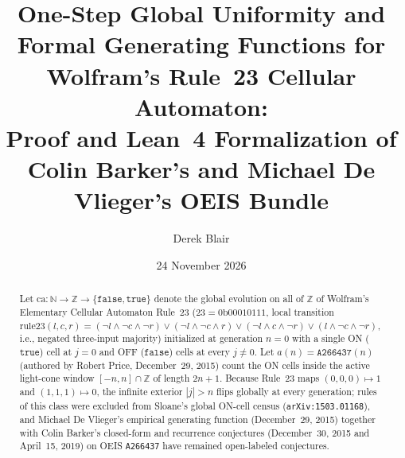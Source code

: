 \documentclass[11pt]{article}
\title{One-Step Global Uniformity and Formal Generating Functions for Wolfram's Rule~23 Cellular Automaton:\\[2pt]
\large Proof and Lean~4 Formalization of Colin Barker's and Michael De Vlieger's OEIS \seq{A266437} Bundle}
\author{Derek Blair}
\date{24 November 2026}
\theoremstyle{definition}
\newcommand{\N}{\mathbb{N}}
\newcommand{\Z}{\mathbb{Z}}
\newcommand{\seq}[1]{\texttt{#1}}
\newcommand{\ca}{\mathrm{ca}}
\newcommand{\ruleTwoThree}{\mathrm{rule23}}
\newcommand{\btrue}{\mathtt{true}}
\newcommand{\bfalse}{\mathtt{false}}
\begin{document}
\maketitle

\begin{abstract}
Let $\ca : \N \to \Z \to \{\bfalse, \btrue\}$ denote the global evolution on all of $\Z$ of Wolfram's Elementary Cellular Automaton Rule~23 ($23 = 0\mathrm{b}00010111$, local transition $\ruleTwoThree(l, c, r) = (\neg l \land \neg c \land \neg r) \lor (\neg l \land \neg c \land r) \lor (\neg l \land c \land \neg r) \lor (l \land \neg c \land \neg r)$, i.e., negated three-input majority) initialized at generation $n = 0$ with a single ON ($\btrue$) cell at $j = 0$ and OFF ($\bfalse$) cells at every $j \ne 0$. Let $a(n) = \seq{A266437}(n)$ (authored by Robert Price, December~29, 2015) count the ON cells inside the active light-cone window $[-n, n] \cap \Z$ of length $2n + 1$. Because Rule~23 maps $(0, 0, 0) \mapsto 1$ and $(1, 1, 1) \mapsto 0$, the infinite exterior $|j| > n$ flips globally at every generation; rules of this class were excluded from Sloane's global ON-cell census (\texttt{arXiv:1503.01168}), and Michael De Vlieger's empirical generating function (December~29, 2015) together with Colin Barker's closed-form and recurrence conjectures (December~30, 2015 and April~15, 2019) on OEIS \seq{A266437} have remained open-labeled conjectures.


\end{abstract}
\end{document}
